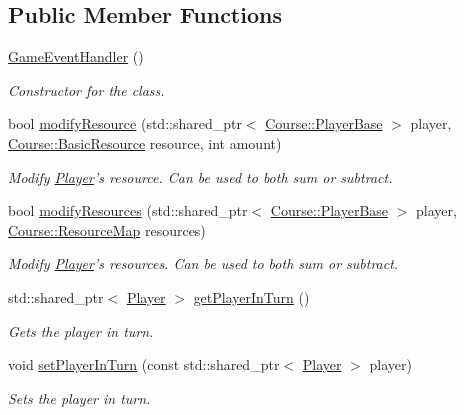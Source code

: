 \subsection*{Public Member Functions}
\begin{DoxyCompactItemize}
\item 
\hyperlink{classGame_1_1GameEventHandler_a5d2bcae44b3675121b2714f5c09f6469}{Game\-Event\-Handler} ()
\begin{DoxyCompactList}\small\item\em Constructor for the class. \end{DoxyCompactList}\item 
bool \hyperlink{classGame_1_1GameEventHandler_a94426aa16bad3385bc3d75249596325c}{modify\-Resource} (std\-::shared\-\_\-ptr$<$ \hyperlink{classCourse_1_1PlayerBase}{Course\-::\-Player\-Base} $>$ player, \hyperlink{namespaceCourse_a02d49c04029594d4adba79b84bb85f65}{Course\-::\-Basic\-Resource} resource, int amount)
\begin{DoxyCompactList}\small\item\em Modify \hyperlink{classGame_1_1Player}{Player}'s resource. Can be used to both sum or subtract. \end{DoxyCompactList}\item 
bool \hyperlink{classGame_1_1GameEventHandler_af2f37590702d555bb6635a6a7793ebb2}{modify\-Resources} (std\-::shared\-\_\-ptr$<$ \hyperlink{classCourse_1_1PlayerBase}{Course\-::\-Player\-Base} $>$ player, \hyperlink{namespaceCourse_ab9a46ed9cd00485e318e5731ea2f78d9}{Course\-::\-Resource\-Map} resources)
\begin{DoxyCompactList}\small\item\em Modify \hyperlink{classGame_1_1Player}{Player}'s resources. Can be used to both sum or subtract. \end{DoxyCompactList}\item 
std\-::shared\-\_\-ptr$<$ \hyperlink{classGame_1_1Player}{Player} $>$ \hyperlink{classGame_1_1GameEventHandler_a6db7a31e0c0484848d74703aec79189b}{get\-Player\-In\-Turn} ()
\begin{DoxyCompactList}\small\item\em Gets the player in turn. \end{DoxyCompactList}\item 
void \hyperlink{classGame_1_1GameEventHandler_aa05246452c9b7304c418c502db72545d}{set\-Player\-In\-Turn} (const std\-::shared\-\_\-ptr$<$ \hyperlink{classGame_1_1Player}{Player} $>$ player)
\begin{DoxyCompactList}\small\item\em Sets the player in turn. \end{DoxyCompactList}\item 

\end{DoxyCompactItemize}
